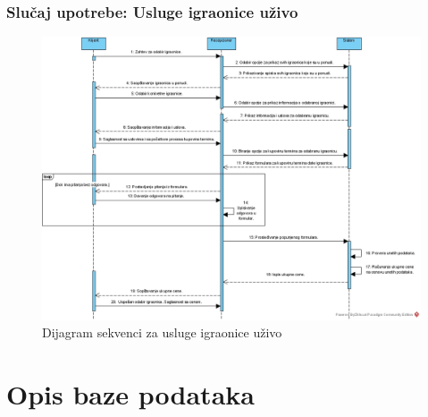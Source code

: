 \documentclass[a4paper]{article}
\begin{document}
\subsubsection{Slučaj upotrebe: Usluge igraonice uživo}

\begin{figure}[!ht]
\begin{center}
\includegraphics[scale=0.4]{sections/images/dijagram_sekvenci_usluge_igraonice_uzivo.jpg}
\end{center}
\caption{Dijagram sekvenci za usluge igraonice uživo}
\label{fig:kontekst}
\end{figure}

\newpage
\newpage
\newpage
\section{Opis baze podataka}

\end{document}
